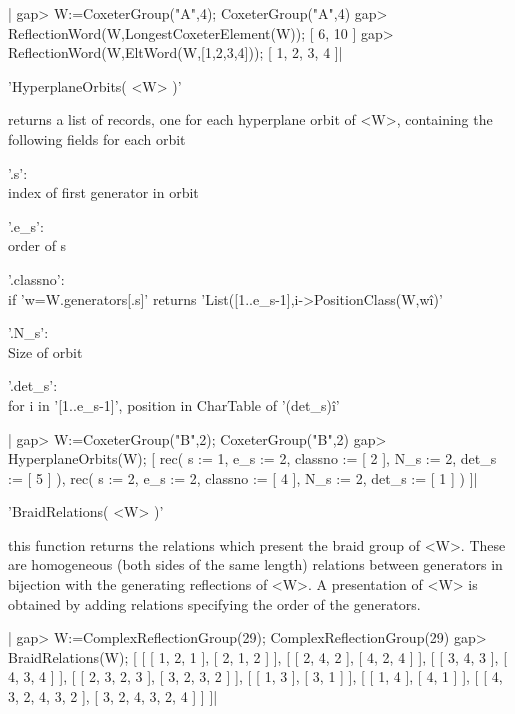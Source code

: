 |    gap> W:=CoxeterGroup("A",4);
    CoxeterGroup("A",4)
    gap> ReflectionWord(W,LongestCoxeterElement(W));
    [ 6, 10 ]
    gap> ReflectionWord(W,EltWord(W,[1,2,3,4]));
    [ 1, 2, 3, 4 ]|


'HyperplaneOrbits( <W> )'

returns a list of records, one for each hyperplane orbit of <W>,
containing the following fields for each orbit\:

 '.s':\\      index of first generator in orbit

 '.e\_s':\\    order of s

 '.classno':\\ if 'w=W.generators[.s]' returns
   'List([1..e\_s-1],i->PositionClass(W,w\^i)'

 '.N\_s':\\    Size of orbit

 '.det\_s':\\  for i in '[1..e\_s-1]', position in CharTable of '(det\_s)\^i'

|    gap> W:=CoxeterGroup("B",2);
    CoxeterGroup("B",2)
    gap> HyperplaneOrbits(W);
    [ rec(
          s := 1,
          e_s := 2,
          classno := [ 2 ],
          N_s := 2,
          det_s := [ 5 ] ), rec(
          s := 2,
          e_s := 2,
          classno := [ 4 ],
          N_s := 2,
          det_s := [ 1 ] ) ]|


'BraidRelations( <W> )'

this function  returns the  relations which present  the braid  group of
<W>. These  are homogeneous  (both sides of  the same  length) relations
between generators in bijection with  the generating reflections of <W>.
A presentation  of <W>  is obtained by  adding relations  specifying the
order of the generators.

|    gap> W:=ComplexReflectionGroup(29);
    ComplexReflectionGroup(29)
    gap> BraidRelations(W);
    [ [ [ 1, 2, 1 ], [ 2, 1, 2 ] ], [ [ 2, 4, 2 ], [ 4, 2, 4 ] ],
      [ [ 3, 4, 3 ], [ 4, 3, 4 ] ], [ [ 2, 3, 2, 3 ], [ 3, 2, 3, 2 ] ],
      [ [ 1, 3 ], [ 3, 1 ] ], [ [ 1, 4 ], [ 4, 1 ] ],
      [ [ 4, 3, 2, 4, 3, 2 ], [ 3, 2, 4, 3, 2, 4 ] ] ]|

